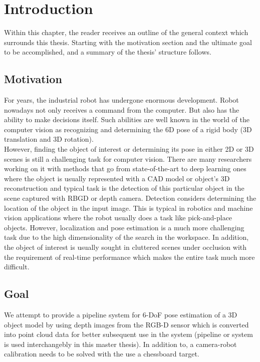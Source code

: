 \chapter{Introduction}
\label{chap:intro}

Within this chapter, the reader receives an outline of the general context which surrounds this thesis. Starting with the motivation section and the ultimate goal to be accomplished, and a summary of the thesis' structure follows. 

\section{Motivation}

For years, the industrial robot has undergone enormous development. Robot nowadays not only receives a command from the computer. But also has the ability to make decisions itself. Such abilities are well known in the world of the computer vision as recognizing and determining the 6D pose of a rigid body (3D translation and 3D rotation). \\
However, finding the object of interest or determining its pose in either 2D or 3D scenes is still a challenging task for computer vision. There are many researchers working on it with methods that go from state-of-the-art to deep learning ones where the object is usually represented with a CAD model or object's 3D reconstruction and typical task is the detection of this particular object in the scene captured with RBGD or depth camera. Detection considers determining the location of the object in the input image. This is typical in robotics and machine vision applications where the robot usually does a task like pick-and-place objects. However, localization and pose estimation is a much more challenging task due to the high dimensionality of the search in the workspace. In addition, the object of interest is usually sought in cluttered scenes under occlusion with the requirement of real-time performance which makes the entire task much more difficult.

\section{Goal}
\iffalse
We attempt to provide a pipeline system for 6-DoF pose estimation of a 3D object model by using depth images from the RGB-D sensor which is converted into point cloud data for better subsequent use in the system (pipeline or system is used interchangebly in this master thesis). In addition to, a camera-robot calibration needs to be solved with the use a chessboard target.

